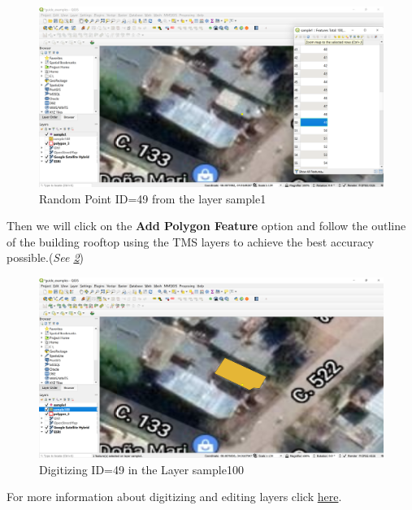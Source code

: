 \documentclass[
]{book}
\begin{document}
\begin{figure}

{\centering \includegraphics[width=1\linewidth]{images/dig} 

}

\caption{Random Point ID=49 from the layer sample1}\label{fig:img-209}
\end{figure}

Then we will click on the \textbf{Add Polygon Feature} option and follow the outline of the building rooftop using the TMS layers to achieve the best accuracy possible.(\emph{See \ref{fig:img-210}})

\begin{figure}

{\centering \includegraphics[width=1\linewidth]{images/dig2} 

}

\caption{Digitizing ID=49 in the Layer sample100}\label{fig:img-210}
\end{figure}

For more information about digitizing and editing layers click \href{https://docs.qgis.org/3.16/en/docs/user_manual/working_with_vector/editing_geometry_attributes.html?highlight=digitizing\#digitizing-an-existing-layer}{here}.
\end{document}
